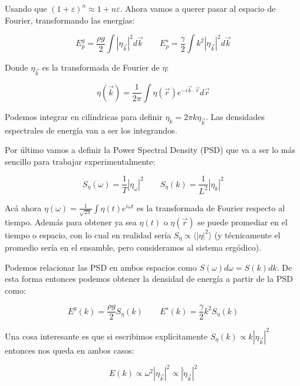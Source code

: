Usando que $(1+\varepsilon)^n\approx1+n\varepsilon$. Ahora vamos a querer pasar al espacio de Fourier, transformando las energías:

\begin{equation}
	E_p^g = \frac{\rho g}{2} \int |\eta_{\vec k}|^2d\vec k \qquad E_p^s = \frac{\gamma}{2} \int k^2|\eta_{\vec k}|^2d\vec k
\end{equation}

Donde $\eta_{\vec k}$ es la transformada de Fourier de $\eta$:

\begin{equation}
	\eta(\vec k) = \frac{1}{2\pi}\int\eta(\vec r)e^{-i\vec k\cdot\vec r} d\vec r
\end{equation}

Podemos integrar en cilíndricas para definir $\eta_k = 2\pi k\eta_{\vec k}$. Las densidades espectrales de energía van a ser los integrandos. 

Por último vamos a definir la Power Spectral Density (PSD) que va a ser lo más sencillo para trabajar experimentalmente:

\begin{equation}
	S_\eta(\omega) = \frac{1}{T} |\eta_\omega|^2 \qquad S_\eta(k) = \frac{1}{L^2} |\eta_k|^2
\end{equation}

Acá ahora $\eta(\omega) = \frac{1}{\sqrt{2\pi}}\int\eta(t)e^{i\omega t}$ es la transformada de Fourier respecto al tiempo. Además para obtener ya sea $\eta(t)$ o $\eta(\vec r)$ se puede promediar en el tiempo o espacio, con lo cual en realidad sería $S_\eta\propto\langle |\eta|^2 \rangle$ (y técnicamente el promedio sería en el ensamble, pero consideramos al sistema ergódico). \cite{falconExperimentsSurfaceGravity2022}

Podemos relacionar las PSD en ambos espacios como $S(\omega)d\omega=S(k)dk$. De esta forma entonces podemos obtener la densidad de energía a partir de la PSD como:

\begin{equation}
		E^g(k) = \frac{\rho g}{2} S_\eta(k) \qquad E^s(k)=\frac{\gamma}{2}k^2S_\eta(k)
\end{equation}


Una cosa interesante es que si escribimos explícitamente $S_\eta(k) \propto k|\eta_{\vec k}|^2$ entonces nos queda en ambos casos:

\begin{equation}
	E(k) \propto \omega^2|\eta_{\vec k}|^2 \propto |\dot \eta_{\vec k}|^2 
\end{equation}

